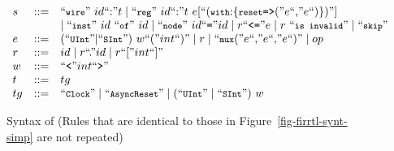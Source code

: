 \begin{figure}[htbp]
\vspace{-3mm}
{
\[
\begin{array}{l l l}
 s & ::= & \mbox{``\fnprettyll{wire}''}\ id\mbox{``:''}t  \mid \mbox{``\fnprettyll{reg}''}\ id\mbox{``:''}t\ e [\mbox{``(\fnprettyll{with}:\{\fnprettyll{reset}{\tt =>}(''} e\mbox{``,''} e \mbox{``)\})''}] \\
  &   &  \mid
  \mbox{``\fnprettyll{inst}''}\ id\ \mbox{``\fnprettyll{of}''}\ id \mid \mbox{``\fnprettyll{node}''}\ id \mbox{``{\tt =}''} id  \mid r \mbox{``{\tt <=}''} e  \mid r\ \mbox{``\fnprettyll{is invalid}''}\mid \mbox{``\fnprettyll{skip}''}\\
%
e & ::= & (\mbox{``\fnprettyll{UInt}''} | \mbox{``\fnprettyll{SInt}''})\ w \mbox{``(''}int\mbox{``)''} \mid r \mid \mbox{``\fnprettyll{mux}(''}e\mbox{``,''} e\mbox{``,''} e\mbox{``)''}
 \mid op\\
%
%
r & ::= & id \mid r\mbox{``.''}id \mid r\mbox{``[''}int\mbox{``]''}\\
w & ::= & \mbox{``{\tt <}''} int \mbox{``{\tt >}''}\\
%
%
%
t & ::= & tg \\
 tg & ::= &  \mbox{``\fnprettyll{Clock}''} \mid \mbox{``\fnprettyll{AsyncReset}''} \mid (\mbox{``\fnprettyll{UInt}''} \mid \mbox{``\fnprettyll{SInt}''})\ w
%
%
\end{array}
\]
}
\vspace{-3mm}
\caption{Syntax of {\lofirrtl} (Rules that are identical to those in Figure~\ref{fig-firrtl-synt-simp} are not repeated)}
\label{fig-lofirrtl-synt}
\vspace{-4mm}
\end{figure}

